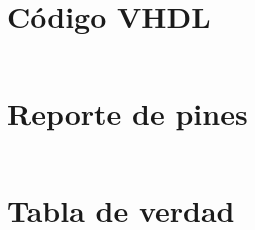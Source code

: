 \documentclass[11pt]{article}
\begin{document}
	\maketitle
	
	\section{Código VHDL}
	\inputminted[tabsize=4,breaklines,linenos]{vhdl}{practica6.vhd}
	
	\clearpage
	
	\section{Reporte de pines}
	\inputminted[tabsize=4,breaklines,linenos]{vhdl}{practica6.rpt}
	
	\section{Tabla de verdad}
\end{document}
